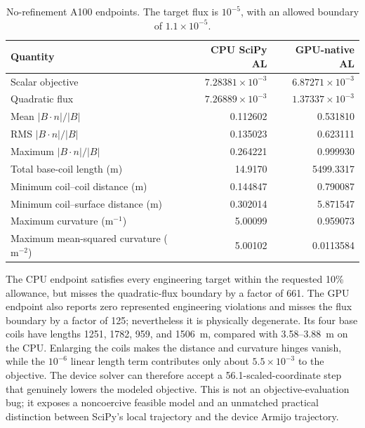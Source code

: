 \documentclass[11pt,a4paper]{article}
\begin{document}
\begin{table}[htbp]
\centering
\small
\caption{No-refinement A100 endpoints.  The target flux is
$10^{-5}$, with an allowed boundary of $1.1\times10^{-5}$.}
\label{tab:end-to-end-al-unbounded-qoi}
\begin{tabular}{lrr}
\toprule
Quantity & CPU SciPy AL & GPU-native AL \\
\midrule
Scalar objective & $7.28381\times10^{-3}$ & $6.87271\times10^{-3}$ \\
Quadratic flux & $7.26889\times10^{-3}$ & $1.37337\times10^{-3}$ \\
Mean $|B\cdot n|/|B|$ & 0.112602 & 0.531810 \\
RMS $|B\cdot n|/|B|$ & 0.135023 & 0.623111 \\
Maximum $|B\cdot n|/|B|$ & 0.264221 & 0.999930 \\
Total base-coil length (m) & 14.9170 & 5499.3317 \\
Minimum coil--coil distance (m) & 0.144847 & 0.790087 \\
Minimum coil--surface distance (m) & 0.302014 & 5.871547 \\
Maximum curvature ($\mathrm{m}^{-1}$) & 5.00099 & 0.959073 \\
Maximum mean-squared curvature ($\mathrm{m}^{-2}$) & 5.00102 & 0.0113584 \\
\bottomrule
\end{tabular}
\end{table}

The CPU endpoint satisfies every engineering target within the requested 10\%
allowance, but misses the quadratic-flux boundary by a factor of 661.  The GPU
endpoint also reports zero represented engineering violations and misses the
flux boundary by a factor of 125; nevertheless it is physically degenerate.
Its four base coils have lengths 1251, 1782, 959, and 1506~m, compared with
3.58--3.88~m on the CPU.  Enlarging the coils makes the distance and curvature
hinges vanish, while the $10^{-6}$ linear length term contributes only about
$5.5\times10^{-3}$ to the objective.  The device solver can therefore accept
a 56.1-scaled-coordinate step that genuinely lowers the modeled objective.
This is not an objective-evaluation bug; it exposes a noncoercive feasible
model and an unmatched practical distinction between SciPy's local trajectory
and the device Armijo trajectory.
\end{document}

